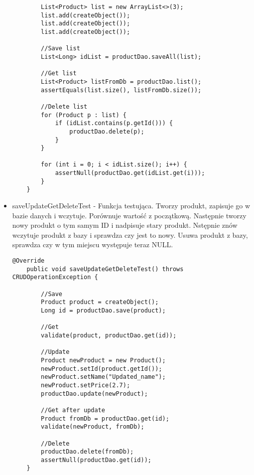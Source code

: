 \documentclass[a4paper,11pt,notitlepage]{article}
\begin{document}
\begin{itemize}
\begin{footnotesize}
\begin{verbatim}
        List<Product> list = new ArrayList<>(3);
        list.add(createObject());
        list.add(createObject());
        list.add(createObject());

        //Save list   
        List<Long> idList = productDao.saveAll(list);

        //Get list
        List<Product> listFromDb = productDao.list();
        assertEquals(list.size(), listFromDb.size());

        //Delete list
        for (Product p : list) {
            if (idList.contains(p.getId())) {
                productDao.delete(p);
            }
        }

        for (int i = 0; i < idList.size(); i++) {
            assertNull(productDao.get(idList.get(i)));
        }
    }
\end{verbatim}\end{footnotesize}

\item saveUpdateGetDeleteTest - Funkcja testująca. Tworzy produkt, zapisuje go w bazie danych i wczytuje. Porównuje wartość z początkową. Następnie tworzy nowy produkt o tym samym ID i nadpisuje stary produkt. Nstępnie znów wczytuje produkt z bazy i sprawdza czy jest to nowy. Usuwa produkt z bazy, sprawdza czy w tym miejscu występuje teraz NULL.
\begin{footnotesize}\begin{verbatim}
@Override
    public void saveUpdateGetDeleteTest() throws CRUDOperationException {

        //Save
        Product product = createObject();
        Long id = productDao.save(product);

        //Get
        validate(product, productDao.get(id));

        //Update
        Product newProduct = new Product();
        newProduct.setId(product.getId());
        newProduct.setName("Updated_name");
        newProduct.setPrice(2.7);
        productDao.update(newProduct);

        //Get after update
        Product fromDb = productDao.get(id);
        validate(newProduct, fromDb);

        //Delete
        productDao.delete(fromDb);
        assertNull(productDao.get(id));
    }
\end{verbatim}\end{footnotesize}
\end{itemize}
\end{document}

